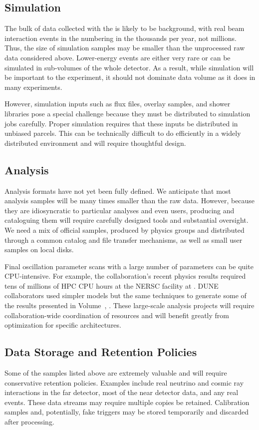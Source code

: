 \subsection{Simulation}
The bulk of data collected with the  is likely to be background, with real beam interaction events in the  numbering in the thousands per year, not millions. Thus, the size of simulation samples may be %
smaller than the unprocessed raw data considered above.  Lower-energy events are either very rare or can be simulated in sub-volumes of the whole detector.  As a result, while simulation will be important to the experiment, it should not dominate data volume as it does in many experiments.  

However, simulation inputs such as flux files, overlay samples, and shower libraries pose a special challenge because they must be distributed to simulation jobs carefully.   Proper simulation requires that these inputs be distributed in unbiased parcels.  This can be technically difficult to do efficiently in a widely distributed environment and will require thoughtful design. 

\subsection{Analysis}

Analysis formats have not yet been fully defined.  We anticipate that most analysis samples will be many times smaller than the raw data.  However, because they are idiosyncratic to particular analyses and even users,  producing and cataloguing them will require carefully designed tools and substantial oversight. 
We need a mix of official samples, produced by physics groups and distributed through a common catalog and file transfer mechanisms, as well as small user samples on local disks. 

Final oscillation parameter scans with a large number of %
parameters can be quite CPU-intensive.  For example, the  collaboration's recent physics results required tens of millions of  HPC CPU hours at the NERSC facility at . DUNE collaborators used simpler models but the same techniques to generate some of the results presented in Volume~\volnumberphysics{}, \voltitlephysics{}. These large-scale analysis projects will require collaboration-wide coordination of resources and will benefit greatly from optimization for specific architectures.

\subsection{Data Storage and Retention Policies}
Some of the samples listed above are extremely valuable and will require conservative retention policies.   Examples include real neutrino and cosmic ray interactions in the far detector, most of the near detector data, and any real  events.  These data streams may require multiple copies be retained. Calibration samples and, potentially, fake  triggers may be stored temporarily and discarded after processing. 


